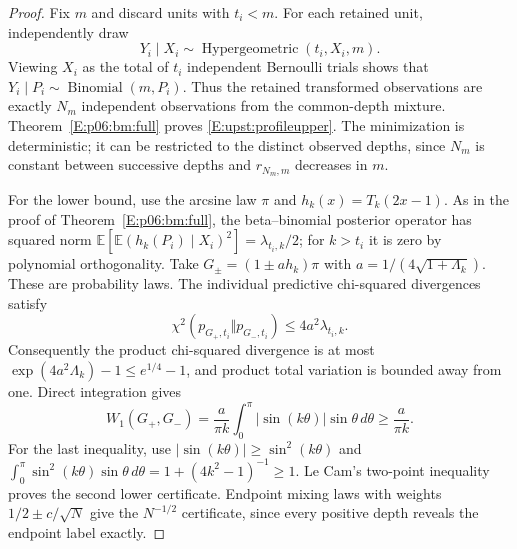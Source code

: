 \documentclass[11pt,a4paper]{article}
\theoremstyle{definition}
\theoremstyle{remark}
\numberwithin{equation}{section}
\begin{document}
\begin{proof}
Fix $m$ and discard units with $t_i<m$. For each retained unit,
independently draw
\[
 Y_i\mid X_i\sim\operatorname{Hypergeometric}(t_i,X_i,m).
\]
Viewing $X_i$ as the total of $t_i$ independent
Bernoulli trials shows that $Y_i\mid P_i\sim\operatorname{Binomial}(m,P_i)$.
Thus the retained transformed observations are exactly $N_m$ independent
observations from the common-depth mixture. Theorem~\ref{E:p06:bm:full}
proves \eqref{E:upst:profileupper}. The minimization is deterministic;
it can be restricted to the distinct observed depths, since $N_m$
is constant between successive depths and $r_{N_m,m}$ decreases in $m$.

For the lower bound, use the arcsine law $\pi$ and
$h_k(x)=T_k(2x-1)$. As in the proof of Theorem~\ref{E:p06:bm:full},
the beta--binomial posterior operator has squared norm
$\mathbb E[\mathbb E(h_k(P_i)\mid X_i)^2]=\lambda_{t_i,k}/2$;
for $k>t_i$ it is zero by polynomial orthogonality. Take
$G_\pm=(1\pm a h_k)\pi$ with
$a=1/(4\sqrt{1+\Lambda_k})$. These are probability laws.
The individual predictive chi-squared divergences satisfy
\[
 \chi^2(p_{G_+,t_i}\Vert p_{G_-,t_i})
 \le4a^2\lambda_{t_i,k}.
\]
Consequently the product chi-squared divergence is at most
$\exp(4a^2\Lambda_k)-1\le e^{1/4}-1$, and product total variation
is bounded away from one. Direct integration gives
\[
 W_1(G_+,G_-)=\frac a{\pi k}
        \int_0^\pi|\sin(k\theta)|\sin\theta\,d\theta
 \ge\frac a{\pi k}.
\]
For the last inequality, use $|\sin(k\theta)|\ge\sin^2(k\theta)$
and
$\int_0^\pi\sin^2(k\theta)\sin\theta\,d\theta
 =1+(4k^2-1)^{-1}\ge1$.
Le Cam's two-point inequality proves the second lower certificate.
Endpoint mixing laws with weights $1/2\pm c/\sqrt N$ give the
$N^{-1/2}$ certificate, since every positive depth reveals the
endpoint label exactly.
\end{proof}
\end{document}
